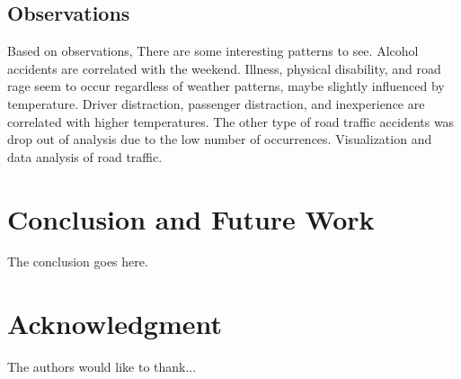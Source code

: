 \documentclass[conference]{IEEEtran}
\begin{document}
\subsection{Observations}
Based on observations, There are some interesting patterns to see. Alcohol accidents are correlated with the weekend. Illness, physical disability, and road rage seem to occur regardless of weather patterns, maybe slightly influenced by temperature. Driver distraction, passenger distraction, and inexperience are correlated with higher temperatures. The other type of road traffic accidents was drop out of analysis due to the low number of occurrences. Visualization and data analysis of road traffic. 
\section{Conclusion and Future Work}
The conclusion goes here.






\section*{Acknowledgment}
The authors would like to thank...



{\small}
 
\end{document}
